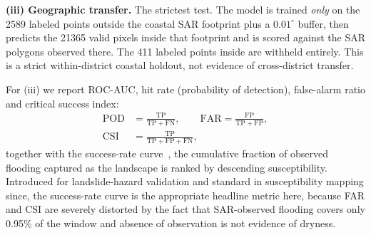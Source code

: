 \documentclass[10pt,twocolumn]{article}
\begin{document}
\textbf{(iii) Geographic transfer.} The strictest test. The model is trained
\emph{only} on the \num{2589} labeled points outside the coastal SAR footprint
plus a $0.01^\circ$ buffer, then predicts the \num{21365} valid pixels inside
that footprint and is scored against the SAR polygons observed there. The
\num{411} labeled points inside are withheld entirely. This is a strict
within-district coastal holdout, not evidence of cross-district transfer.

For (iii) we report ROC-AUC, hit rate (probability of detection),
false-alarm ratio and critical success index:
\begin{equation}
\begin{aligned}
\mathrm{POD}&=\tfrac{\mathrm{TP}}{\mathrm{TP}+\mathrm{FN}}, \qquad
\mathrm{FAR}=\tfrac{\mathrm{FP}}{\mathrm{TP}+\mathrm{FP}}, \\[2pt]
\mathrm{CSI}&=\tfrac{\mathrm{TP}}{\mathrm{TP}+\mathrm{FP}+\mathrm{FN}},
\end{aligned}
\label{eq:contingency}
\end{equation}
together with the success-rate curve~\citep{chung2003}, the cumulative fraction
of observed flooding captured as the landscape is ranked by descending
susceptibility. Introduced for landslide-hazard validation and standard in
susceptibility mapping since, the success-rate curve is the appropriate headline
metric here, because FAR and CSI
are severely distorted by the fact that SAR-observed flooding covers only 0.95\%
of the window and absence of observation is not evidence of dryness.
\end{document}
